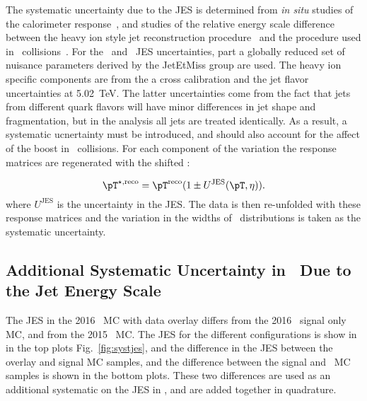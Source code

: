 The systematic uncertainty due to the JES is determined from \textit{in situ} studies of the calorimeter response~\cite{Aad:2011he,HIjesnote,Run2jetpubnote,Aaboud:2018twu}, and studies of the relative energy scale difference between the heavy ion style jet reconstruction procedure~\cite{HIjesnote} and the procedure used in \pp\ collisions~\cite{Aad:2014bia}. For the \pp\ and \pPb\ JES uncertainties, part a globally reduced set of nuisance parameters derived by the JetEtMiss group are used. The heavy ion specific components are from the a cross calibration and the jet flavor uncertainties at 5.02~TeV. The latter uncertainties come from the fact that jets from different quark flavors will have minor differences in jet shape and fragmentation, but in the analysis all jets are treated identically. As a result, a systematic ucnertainty must be introduced, and should also account for the affect of the boost in \pPb\ collisions. For each component of the variation the response matrices are regenerated with the shifted \ptjet:

\begin{equation}
   \pT^{\star,\mathrm{reco}} = \pT^{\mathrm{reco}} (1\pm U^{\mathrm{JES}}(\pT , \eta)).
\end{equation}
where $U^{\mathrm{JES}}$ is the uncertainty in the JES. The data is then re-unfolded with these response matrices and the variation in the widths of \conetwo\ distributions is taken as the systematic uncertainty.

\subsection{Additional Systematic Uncertainty in \pPb\ Due to the Jet Energy Scale} 
The JES in the 2016 \pPb\ MC with data overlay differs from the 2016 \pPb\ signal only MC, and from the 2015 \pp\ MC. The JES for the different configurations is show in in the top plots Fig.~\ref{fig:systjes}, and the difference in the JES between the overlay and signal MC samples, and the difference between the signal and \pp\ MC samples is shown in the bottom plots. These two differences are used as an additional systematic on the JES in \pPb, and are added together in quadrature. 

